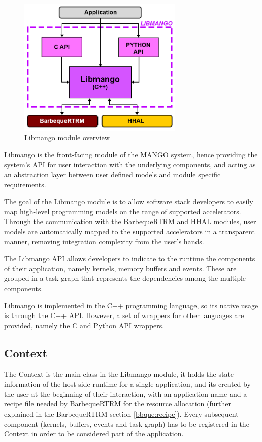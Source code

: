 \begin{figure}[ht]
    \centering
    \includegraphics[width=0.7\textwidth]{img/libmango.png}
    \captionsetup{justification=centering}
    \caption{Libmango module overview}
    \label{fig:libmango}
\end{figure}

Libmango is the front-facing module of the MANGO system, hence providing the system's API for user interaction with the underlying components, and acting as an abstraction layer between user defined models and module specific requirements.

The goal of the Libmango module is to allow software stack developers to easily map high-level programming models on the range of supported accelerators. Through the communication with the BarbequeRTRM and HHAL modules, user models are automatically mapped to the supported accelerators in a transparent manner, removing integration complexity from the user's hands.

The Libmango API allows developers to indicate to the runtime the components of their application, namely kernels, memory buffers and events. These are grouped in a task graph that represents the dependencies among the multiple components. 

Libmango is implemented in the C++ programming language, so its native usage is through the C++ API. However, a set of wrappers for other languages are provided, namely the C and Python API wrappers.

\subsection{Context}
The Context is the main class in the Libmango module, it holds the state information of the host side runtime for a single application, and its created by the user at the beginning of their interaction, with an application name and a recipe file needed by BarbequeRTRM for the resource allocation (further explained in the BarbequeRTRM section \ref{bbque:recipe}). Every subsequent component (kernels, buffers, events and task graph) has to be registered in the Context in order to be considered part of the application.

